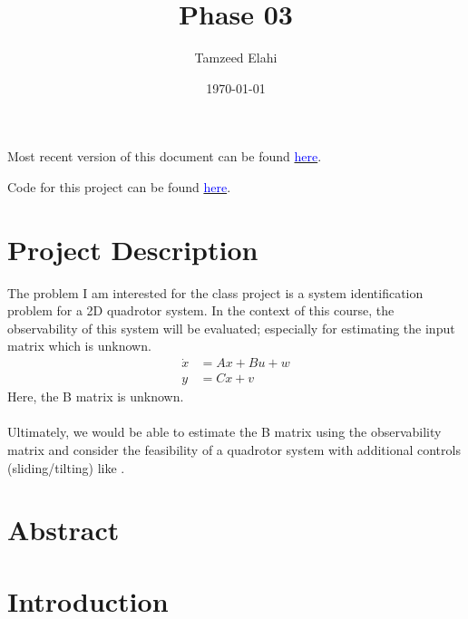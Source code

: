 \documentclass[12pt]{article}
\title{Phase 03}
\author{Tamzeed Elahi}
\date{\today}
\begin{document}
\maketitle

Most recent version of this document can be found \href{https://github.com/tamzeed-toha/Nonlinear_and_Data_Driven_Estimation/blob/main/write_ups/phase_02.pdf}{\textcolor{blue}{here}}. 

Code for this project can be found \href{https://github.com/tamzeed-toha/Nonlinear_and_Data_Driven_Estimation/blob/main/project/phase_02.ipynb}{\textcolor{blue}{here}}.

\section*{Project Description}
The problem I am interested for the class project is a system identification problem for a 2D quadrotor system. In the context of this course, the observability of this system will be evaluated; especially for estimating the input matrix which is unknown. 
\begin{align*}
    \dot{x} &= Ax + Bu + w \\
    y &= Cx + v
\end{align*} 
Here, the B matrix is unknown. \\\\
Ultimately, we would be able to estimate the B matrix using the observability matrix and consider the feasibility of a quadrotor system with additional controls (sliding/tilting) like \cite{Nemati2014}. 

\section*{Abstract}



\section*{Introduction}
\end{document}
